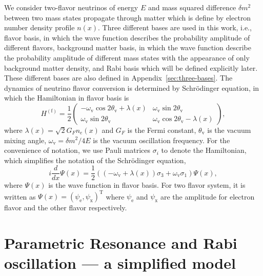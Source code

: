 \documentclass[%
reprint,
 amsmath,amssymb,
 aps,
]{revtex4-1}
\begin{document}
We consider two-flavor neutrinos of energy $E$ and mass squared difference $\delta m^2$ between two mass states propagate through matter which is define by electron number density profile $n(x)$. Three different bases are used in this work, i.e., flavor basis, in which the wave function describes the probability amplitude of different flavors, background matter basis, in which the wave function describe the probability amplitude of different mass states with the appearance of only background matter density, and Rabi basis which will be defined explicitly later. These different bases are also defined in Appendix~\ref{sec:three-bases}. The dynamics of neutrino flavor conversion is determined by Schr\"{o}dinger equation, in which the Hamiltonian in flavor basis is
\begin{equation}
    H^{(\mathrm{f})} =  \frac{1}{2} \begin{pmatrix}
    -\omega_{\mathrm{v}} \cos 2\theta_{\mathrm{v}} + \lambda(x) & \omega_{\mathrm{v}}\sin 2\theta_{\mathrm{v}} \\
   \omega_{\mathrm{v}} \sin 2\theta_{\mathrm{v}} & \omega_{\mathrm{v}} \cos 2\theta_{\mathrm{v}} - \lambda(x)
    \end{pmatrix},
\end{equation}
where $\lambda(x)= \sqrt{2}G_F n_e(x)$ and $G_F$ is the Fermi constant, $\theta_{\mathrm{v}}$ is the vacuum mixing angle, $\omega_{\mathrm{v}} = \delta m^2/4E$ is the vacuum oscillation frequency. For the convenience of notation, we use Pauli matrices $\sigma_i$ to denote the Hamiltonian, which simplifies the notation of the Schr\"{o}dinger equation,
\begin{equation}
    i\frac{d}{dx}\Psi(x) = \frac{1}{2} \left(  
    (- \omega_{\mathrm{v}} + \lambda(x) ) \sigma_3 + \omega_{\mathrm{v}} \sigma_1 
    \right)
    \Psi(x),
\end{equation}
where $\Psi(x)$ is the wave function in flavor basis. For two flavor system, it is written as $ \Psi(x) = \left(
    \psi_{\mathrm{e}} ,
    \psi_{\mathrm{x}}
    \right)^{\mathrm{T}}$ where $\psi_{\mathrm{e}}$ and $\psi_{\mathrm{x}}$ are the amplitude for electron flavor and the other flavor respectively.



\section{\label{sec:simple}Parametric Resonance and Rabi oscillation --- a simplified model}%
\end{document}
